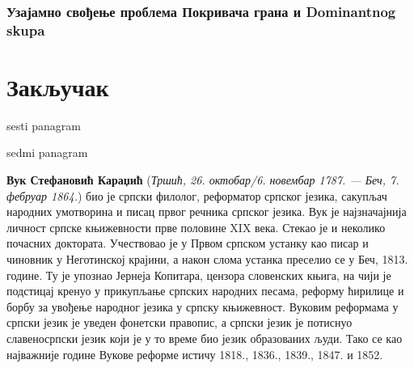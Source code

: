 \documentclass[12pt,oneside]{memoir}
\begin{document}
\subsection{Узајамно свођење проблема Покривача грана и Dominantnog skupa}


\chapter{Закључак}
sesti panagram

sedmi panagram

\literatura

\backmatter

\begin{biografija}
\textbf{Вук Стефановић Караџић} (\emph{Тршић, 26. октобар/6. новембар
  1787. — Беч, 7. фебруар 1864.}) био је српски филолог, реформатор
српског језика, сакупљач народних умотворина и писац првог речника
српског језика.  Вук је најзначајнија личност српске књижевности прве
половине XIX века. Стекао је и неколико почасних доктората.
Учествовао је у Првом српском устанку као писар и чиновник у
Неготинској крајини, а након слома устанка преселио се у Беч,
1813. године. Ту је упознао Јернеја Копитара, цензора словенских
књига, на чији је подстицај кренуо у прикупљање српских народних
песама, реформу ћирилице и борбу за увођење народног језика у српску
књижевност. Вуковим реформама у српски језик је уведен фонетски
правопис, а српски језик је потиснуо славеносрпски језик који је у то
време био језик образованих људи. Тако се као најважније године Вукове
реформе истичу 1818., 1836., 1839., 1847. и 1852.
\end{biografija}
\end{document}
